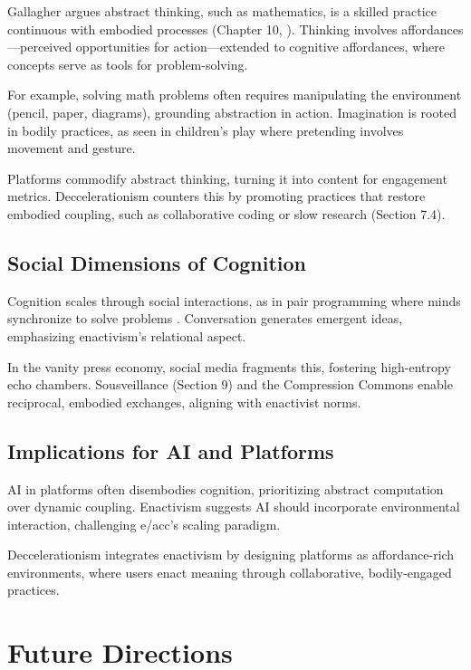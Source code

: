 \documentclass[12pt]{article}
\begin{document}
Gallagher argues abstract thinking, such as mathematics, is a skilled practice continuous with embodied processes (Chapter 10, \citealp{Gallagher2017}). Thinking involves affordances—perceived opportunities for action—extended to cognitive affordances, where concepts serve as tools for problem-solving.

For example, solving math problems often requires manipulating the environment (pencil, paper, diagrams), grounding abstraction in action. Imagination is rooted in bodily practices, as seen in children's play where pretending involves movement and gesture.

Platforms commodify abstract thinking, turning it into content for engagement metrics. Deccelerationism counters this by promoting practices that restore embodied coupling, such as collaborative coding or slow research (Section 7.4).

\subsection{Social Dimensions of Cognition}

Cognition scales through social interactions, as in pair programming where minds synchronize to solve problems \citep{Gallagher2017}. Conversation generates emergent ideas, emphasizing enactivism's relational aspect.

In the vanity press economy, social media fragments this, fostering high-entropy echo chambers. Sousveillance (Section 9) and the Compression Commons enable reciprocal, embodied exchanges, aligning with enactivist norms.

\subsection{Implications for AI and Platforms}

AI in platforms often disembodies cognition, prioritizing abstract computation over dynamic coupling. Enactivism suggests AI should incorporate environmental interaction, challenging e/acc's scaling paradigm.

Deccelerationism integrates enactivism by designing platforms as affordance-rich environments, where users enact meaning through collaborative, bodily-engaged practices.

\section{Future Directions}
\end{document}
